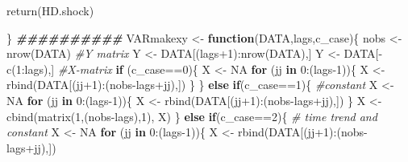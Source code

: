 \documentclass[
]{book}
\newenvironment{Shaded}{\begin{snugshade}}{\end{snugshade}}
\newcommand{\CommentTok}[1]{\textcolor[rgb]{0.56,0.35,0.01}{\textit{#1}}}
\newcommand{\ConstantTok}[1]{\textcolor[rgb]{0.00,0.00,0.00}{#1}}
\newcommand{\ControlFlowTok}[1]{\textcolor[rgb]{0.13,0.29,0.53}{\textbf{#1}}}
\newcommand{\DecValTok}[1]{\textcolor[rgb]{0.00,0.00,0.81}{#1}}
\newcommand{\DocumentationTok}[1]{\textcolor[rgb]{0.56,0.35,0.01}{\textbf{\textit{#1}}}}
\newcommand{\FunctionTok}[1]{\textcolor[rgb]{0.00,0.00,0.00}{#1}}
\newcommand{\NormalTok}[1]{#1}
\newcommand{\OtherTok}[1]{\textcolor[rgb]{0.56,0.35,0.01}{#1}}
\newcommand{\SpecialCharTok}[1]{\textcolor[rgb]{0.00,0.00,0.00}{#1}}
\begin{document}
\begin{Shaded}
\begin{Highlighting}[]
  \FunctionTok{return}\NormalTok{(HD.shock)}

\NormalTok{\}}
\DocumentationTok{\#\#\#\#\#\#\#\#\#\#}
\NormalTok{VARmakexy }\OtherTok{\textless{}{-}} \ControlFlowTok{function}\NormalTok{(DATA,lags,c\_case)\{}
\NormalTok{  nobs }\OtherTok{\textless{}{-}} \FunctionTok{nrow}\NormalTok{(DATA)}
  \CommentTok{\#Y matrix}
\NormalTok{  Y }\OtherTok{\textless{}{-}}\NormalTok{ DATA[(lags}\SpecialCharTok{+}\DecValTok{1}\NormalTok{)}\SpecialCharTok{:}\FunctionTok{nrow}\NormalTok{(DATA),]}
\NormalTok{  Y }\OtherTok{\textless{}{-}}\NormalTok{ DATA[}\SpecialCharTok{{-}}\FunctionTok{c}\NormalTok{(}\DecValTok{1}\SpecialCharTok{:}\NormalTok{lags),]}
  \CommentTok{\#X{-}matrix}
  \ControlFlowTok{if}\NormalTok{ (c\_case}\SpecialCharTok{==}\DecValTok{0}\NormalTok{)\{}
\NormalTok{    X }\OtherTok{\textless{}{-}} \ConstantTok{NA}
    \ControlFlowTok{for}\NormalTok{ (jj }\ControlFlowTok{in} \DecValTok{0}\SpecialCharTok{:}\NormalTok{(lags}\DecValTok{{-}1}\NormalTok{))\{}
\NormalTok{      X }\OtherTok{\textless{}{-}} \FunctionTok{rbind}\NormalTok{(DATA[(jj}\SpecialCharTok{+}\DecValTok{1}\NormalTok{)}\SpecialCharTok{:}\NormalTok{(nobs}\SpecialCharTok{{-}}\NormalTok{lags}\SpecialCharTok{+}\NormalTok{jj),])}
\NormalTok{    \}}
\NormalTok{  \} }\ControlFlowTok{else} \ControlFlowTok{if}\NormalTok{(c\_case}\SpecialCharTok{==}\DecValTok{1}\NormalTok{)\{ }\CommentTok{\#constant}
\NormalTok{    X }\OtherTok{\textless{}{-}} \ConstantTok{NA}
    \ControlFlowTok{for}\NormalTok{ (jj }\ControlFlowTok{in} \DecValTok{0}\SpecialCharTok{:}\NormalTok{(lags}\DecValTok{{-}1}\NormalTok{))\{}
\NormalTok{      X }\OtherTok{\textless{}{-}} \FunctionTok{rbind}\NormalTok{(DATA[(jj}\SpecialCharTok{+}\DecValTok{1}\NormalTok{)}\SpecialCharTok{:}\NormalTok{(nobs}\SpecialCharTok{{-}}\NormalTok{lags}\SpecialCharTok{+}\NormalTok{jj),])}
\NormalTok{    \}}
\NormalTok{    X }\OtherTok{\textless{}{-}} \FunctionTok{cbind}\NormalTok{(}\FunctionTok{matrix}\NormalTok{(}\DecValTok{1}\NormalTok{,(nobs}\SpecialCharTok{{-}}\NormalTok{lags),}\DecValTok{1}\NormalTok{), X)}
\NormalTok{  \} }\ControlFlowTok{else} \ControlFlowTok{if}\NormalTok{(c\_case}\SpecialCharTok{==}\DecValTok{2}\NormalTok{)\{ }\CommentTok{\# time trend and constant}
\NormalTok{    X }\OtherTok{\textless{}{-}} \ConstantTok{NA}
    \ControlFlowTok{for}\NormalTok{ (jj }\ControlFlowTok{in} \DecValTok{0}\SpecialCharTok{:}\NormalTok{(lags}\DecValTok{{-}1}\NormalTok{))\{}
\NormalTok{      X }\OtherTok{\textless{}{-}} \FunctionTok{rbind}\NormalTok{(DATA[(jj}\SpecialCharTok{+}\DecValTok{1}\NormalTok{)}\SpecialCharTok{:}\NormalTok{(nobs}\SpecialCharTok{{-}}\NormalTok{lags}\SpecialCharTok{+}\NormalTok{jj),])}

\end{Highlighting}
\end{Shaded}
\end{document}
